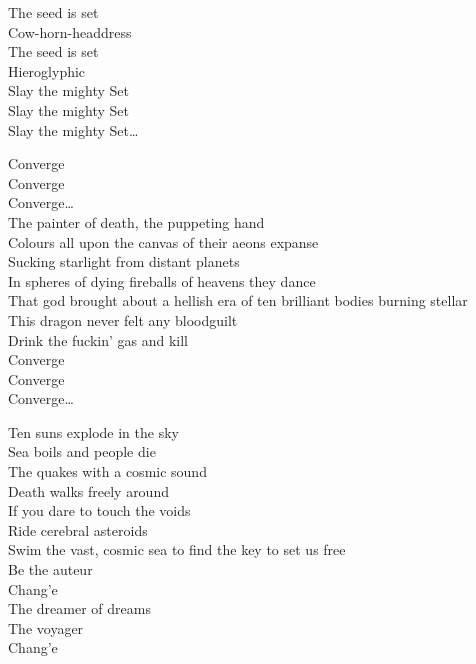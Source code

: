 The seed is set \\
Cow-horn-headdress \\
The seed is set \\
Hieroglyphic \\

Slay the mighty Set \\
Slay the mighty Set \\
Slay the mighty Set… \\


Converge \\
Converge \\
Converge… \\

The painter of death, the puppeting hand \\
Colours all upon the canvas of their aeons expanse \\
Sucking starlight from distant planets \\
In spheres of dying fireballs of heavens they dance \\

That god brought about a hellish era of ten brilliant bodies burning stellar \\
This dragon never felt any bloodguilt \\
Drink the fuckin' gas and kill \\

Converge \\
Converge \\
Converge… \\



Ten suns explode in the sky \\
Sea boils and people die \\
The  quakes with a cosmic sound \\
Death walks freely around \\
If you dare to touch the voids \\
Ride cerebral asteroids \\
Swim the vast, cosmic sea to find the key to set us free \\

Be the auteur \\
Chang'e \\
The dreamer of dreams \\
The voyager \\
Chang'e \\

